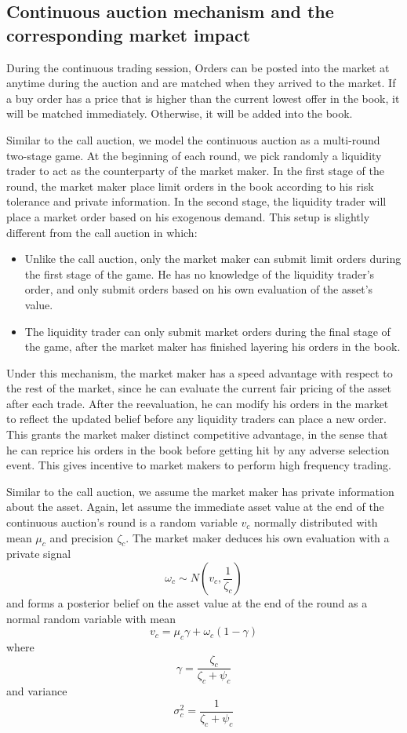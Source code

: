 \documentclass{article}
\begin{document}
\subsection{Continuous auction mechanism and the corresponding market impact}\label{subSecTheoreticalFrameworkContinuousAuction}
During the continuous trading session, Orders can be posted into the market at anytime during the auction and are matched when they arrived to the market. If a buy order has a price that is higher than the current lowest offer in the book, it will be matched immediately. Otherwise, it will be added into the book.

Similar to the call auction, we model the continuous auction as a multi-round two-stage game. At the beginning of each round, we pick randomly a liquidity trader to act as the counterparty of the market maker. In the first stage of the round, the market maker place limit orders in the book according to his risk tolerance and private information. In the second stage, the liquidity trader will place a market order based on his exogenous demand. This setup is slightly different from the call auction in which:
\begin{itemize}
  \item Unlike the call auction, only the market maker can submit limit orders during the first stage of the game. He has no knowledge of the liquidity trader's order, and only submit orders based on his own evaluation of the asset's value.
  \item The liquidity trader can only submit market orders during the final stage of the game, after the market maker has finished layering his orders in the book.
\end{itemize}
Under this mechanism, the market maker has a speed advantage with respect to the rest of the market, since he can evaluate the current fair pricing of the asset after each trade. After the reevaluation, he can modify his orders in the market to reflect the updated belief before any liquidity traders can place a new order. This grants the market maker distinct competitive advantage, in the sense that he can reprice his orders in the book before getting hit by any adverse selection event. This gives incentive to market makers to perform high frequency trading.

Similar to the call auction, we assume the market maker has private information about the asset. Again, let assume the immediate asset value at the end of the continuous auction's round is a random variable $v_c$ normally distributed with mean $\mu_c$ and precision $\zeta_c$. The market maker deduces his own evaluation with a private signal 
\[
  \omega_c \sim N(v_c, \frac{1}{\zeta_c})
\]
and forms a posterior belief on the asset value at the end of the round as a normal random variable with mean
\[
  v_c=\mu_c \gamma + \omega_c(1 - \gamma)
\]
where
\[
  \gamma = \frac{\zeta_c}{\zeta_c+\psi_c}
\]
and variance
\[
  \sigma_c^2=\frac{1}{\zeta_c+\psi_c}
\]
\end{document}
